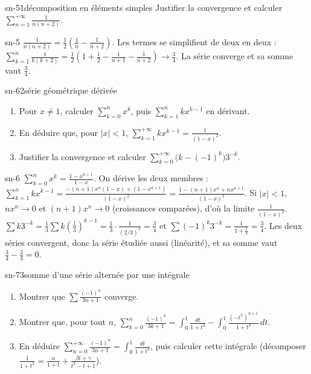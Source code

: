 \begin{exo}{sn-5}{1}{décomposition en éléments simples}
Justifier la convergence et calculer $\sum_{n=1}^{+\infty}\frac1{n(n+2)}$.
\end{exo}

\begin{corrige}{sn-5}
$\frac1{n(n+2)}=\frac12\left(\frac1n-\frac1{n+2}\right)$. Les termes se simplifient de deux en deux :
$\sum_{k=1}^n\frac1{k(k+2)}=\frac12\left(1+\frac12-\frac1{n+1}-\frac1{n+2}\right)\to\frac34$. La série converge et sa somme vaut $\frac34$.
\end{corrige}

\begin{exo}{sn-6}{2}{série géométrique dérivée}
\begin{enumerate}
\item Pour $x\neq1$, calculer $\sum_{k=0}^nx^k$, puis $\sum_{k=1}^nkx^{k-1}$ en dérivant.
\item En déduire que, pour $|x|<1$, $\sum_{k=1}^{+\infty}kx^{k-1}=\frac1{(1-x)^2}$.
\item Justifier la convergence et calculer $\sum_{k=0}^{+\infty}\big(k-(-1)^k\big)3^{-k}$.
\end{enumerate}
\end{exo}

\begin{corrige}{sn-6}
 $\sum_{k=0}^nx^k=\frac{1-x^{n+1}}{1-x}$. On dérive les deux membres :
$\sum_{k=1}^nkx^{k-1}=\frac{-(n+1)x^n(1-x)+(1-x^{n+1})}{(1-x)^2}=\frac{1-(n+1)x^n+nx^{n+1}}{(1-x)^2}$.
 Si $|x|<1$, $nx^n\to0$ et $(n+1)x^n\to0$ (croissances comparées), d'où la limite $\frac1{(1-x)^2}$.
 $\sum k3^{-k}=\frac13\sum k\left(\frac13\right)^{k-1}=\frac13\cdot\frac1{(2/3)^2}=\frac34$ et $\sum(-1)^k3^{-k}=\frac1{1+\frac13}=\frac34$. Les
deux séries convergent, donc la série étudiée aussi (linéarité), et sa somme vaut $\frac34-\frac34=0$.
\end{corrige}

\begin{exo}{sn-7}{3}{somme d'une série alternée par une intégrale}
\begin{enumerate}
\item Montrer que $\sum\frac{(-1)^n}{3n+1}$ converge.
\item Montrer que, pour tout $n$, $\displaystyle\sum_{k=0}^n\frac{(-1)^k}{3k+1}=\int_0^1\frac{dt}{1+t^3}-\int_0^1\frac{(-t^3)^{n+1}}{1+t^3}\,dt$.
\item En déduire $\displaystyle\sum_{n=0}^{+\infty}\frac{(-1)^n}{3n+1}=\int_0^1\frac{dt}{1+t^3}$, puis calculer cette intégrale
(décomposer $\frac1{1+t^3}=\frac\alpha{1+t}+\frac{\beta t+\gamma}{t^2-t+1}$).
\end{enumerate}
\end{exo}

